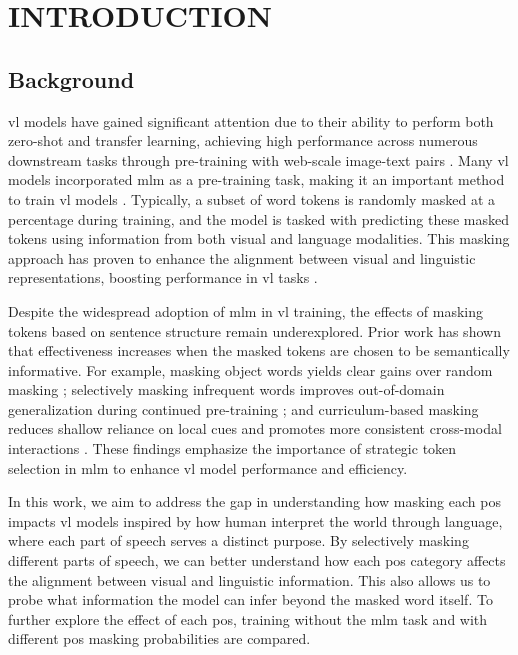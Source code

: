 \setlength{\parindent}{0in}
\setlength{\parskip}{1.5mm}
\setlength{\baselineskip}{1.6em}

\chapter{INTRODUCTION}
\section{Background}
\acrfull{vl} models have gained significant attention due to their ability to perform both zero-shot and transfer learning, achieving high performance across numerous downstream tasks through pre-training with web-scale image-text pairs \cite{s-clip, medclip, vl-review}.  
Many \acrshort{vl} models incorporated \acrfull{mlm} as a pre-training task, making it an important method to train \acrshort{vl} models \cite{albef, mplug, uniter, beit-3, lxmert}.  
Typically, a subset of word tokens is randomly masked at a percentage during training, and the model is tasked with predicting these masked tokens using information from both visual and language modalities.  
This masking approach has proven to enhance the alignment between visual and linguistic representations, boosting performance in \acrshort{vl} tasks \cite{lxmert}. 

Despite the widespread adoption of \acrshort{mlm} in \acrshort{vl} training, the effects of masking tokens based on sentence structure remain underexplored.
Prior work has shown that effectiveness increases when the masked tokens are chosen to be semantically informative. 
For example, masking object words yields clear gains over random masking \cite{mask_object}; selectively masking infrequent words improves out-of-domain generalization during continued pre-training \cite{selective_masking}; and curriculum-based masking reduces shallow reliance on local cues and promotes more consistent cross-modal interactions \cite{rf-curriculum-masking}. 
These findings emphasize the importance of strategic token selection in \acrshort{mlm} to enhance \acrshort{vl} model performance and efficiency.

In this work, we aim to address the gap in understanding how masking each \acrfull{pos} impacts \acrshort{vl} models inspired by how human interpret the world through language, where each part of speech serves a distinct purpose.
By selectively masking different parts of speech, we can better understand how each \acrshort{pos} category affects the alignment between visual and linguistic information.
This also allows us to probe what information the model can infer beyond the masked word itself.
To further explore the effect of each \acrshort{pos}, training without the \acrshort{mlm} task and with different \acrshort{pos} masking probabilities are compared.

